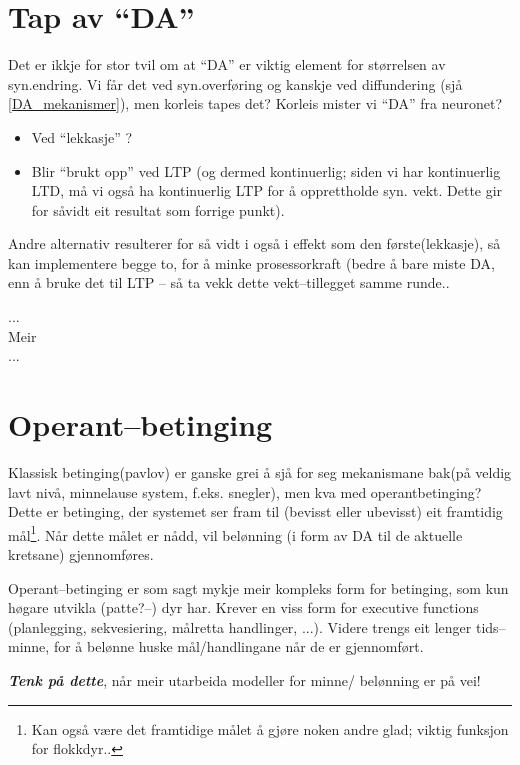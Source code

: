 \section{Tap av ``DA''}
Det er ikkje for stor tvil om at ``DA'' er viktig element for størrelsen av syn.endring. Vi får det ved syn.overføring og kanskje ved diffundering (sjå \ref{DA_mekanismer}), men korleis tapes det? Korleis mister vi ``DA'' fra neuronet?
\begin{itemize}
	\item Ved ``lekkasje'' ?
	\item Blir ``brukt opp'' ved LTP (og dermed kontinuerlig; siden vi har kontinuerlig LTD, må vi også ha kontinuerlig LTP for å opprettholde syn. vekt. Dette gir for såvidt eit resultat som forrige punkt).
\end{itemize}
Andre alternativ resulterer for så vidt i også i effekt som den første(lekkasje), så kan implementere begge to, for å minke prosessorkraft (bedre å bare miste DA, enn å bruke det til LTP -- så ta vekk dette vekt--tillegget samme runde..


...\\
Meir\\
...


\section{Operant--betinging}
Klassisk betinging(pavlov) er ganske grei å sjå for seg mekanismane bak(på veldig lavt nivå, minnelause system, f.eks. snegler), men kva med operantbetinging? Dette er betinging, der systemet ser fram til (bevisst eller ubevisst) eit framtidig mål\footnote{Kan også være det framtidige målet å gjøre noken andre glad; viktig funksjon for flokkdyr..}.
Når dette målet er nådd, vil belønning (i form av DA til de aktuelle kretsane) gjennomføres.

Operant--betinging er som sagt mykje meir kompleks form for betinging, som kun høgare utvikla (patte?--) dyr har. Krever en viss form for executive functions (planlegging, sekvesiering, målretta handlinger, ...). Videre trengs eit lenger tids--minne, for å belønne huske mål/handlingane når de er gjennomført. 

\textbf{\emph{Tenk på dette}}, når meir utarbeida modeller for minne/ belønning er på vei!


